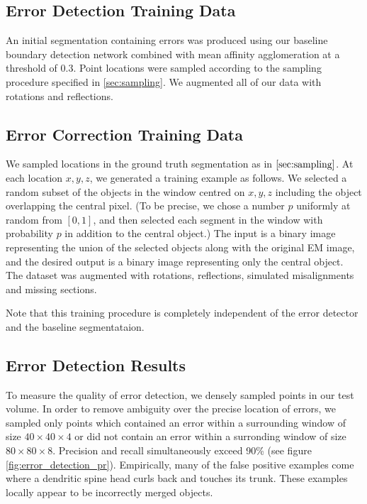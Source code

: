 \documentclass{article}
\begin{document}
\subsection{Error Detection Training Data}
An initial segmentation containing errors was produced using our baseline boundary detection network combined with mean affinity agglomeration at a threshold of 0.3. Point locations were sampled according to the sampling procedure specified in \ref{sec:sampling}. We augmented all of our data with rotations and reflections. 

\subsection{Error Correction Training Data}
We sampled locations in the ground truth segmentation as in $\ref{sec:sampling}$. At each location $x,y,z$, we generated a training example as follows. We selected a random subset of the objects in the window centred on $x,y,z$ including the object overlapping the central pixel. (To be precise, we chose a number $p$ uniformly at random from $[0,1]$, and then selected each segment in the window with probability $p$ in addition to the central object.) The input is a binary image representing the union of the selected objects along with the original EM image, and the desired output is a binary image representing only the central object. The dataset was augmented with rotations, reflections, simulated misalignments and missing sections.

Note that this training procedure is completely independent of the error detector and the baseline segmentataion.


\subsection{Error Detection Results}
To measure the quality of error detection, we densely sampled points in our test volume. In order to remove ambiguity over the precise location of errors, we sampled only points which contained an error within a surrounding window of size $40\times 40 \times 4$ or did not contain an error within a surronding window of size $80 \times 80 \times 8$. Precision and recall simultaneously exceed 90\% (see figure \ref{fig:error_detection_pr}). Empirically, many of the false positive examples come where a dendritic spine head curls back and touches its trunk. These examples locally appear to be incorrectly merged objects.
\end{document}
